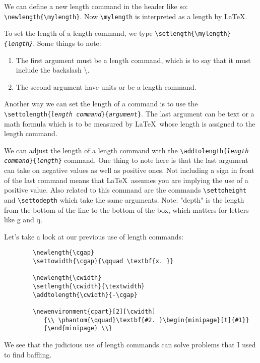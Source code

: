 \documentclass{amsart}
\begin{document}
	We can define a new length command in the header like so:
	\verb+\newlength{\mylength}+.
	Now \verb+\mylength+ is interpreted as a length by \LaTeX. 

	To set the length of a length command, we type
	\verb+\setlength{\mylength}+\texttt{\emph{\{length\}}}.
	Some things to note: 
	\begin{enumerate}
		\item The first argument must be a length 
			command, which is to say that it must include the backslash 
			\textbackslash. 
		\item The second argument have units or be a length command. 
	\end{enumerate}

	Another way we can set the length of a command is to use the
	\verb+\settolength+\texttt{\{\emph{length command}\}\{\emph{argument}\}}.
	The last argument can be text or a math formula which is to be measured
	by \LaTeX\ whose length is assigned to the length command. 
	
	We can adjust the length of a length command with the 
	\verb+\addtolength+\texttt{\{\emph{length command}\}\{\emph{length}\}}
	command. 
	One thing to note here is that the last argument can take on negative
	values as well as positive ones. 
	Not including a sign in front of the last command means that \LaTeX\
	assumes you are implying the use of a positive value. 
	Also related to this command are the commands
	\verb+\settoheight+ and \verb+\settodepth+ which take the same
	arguments. 
	Note: "depth" is the length from the bottom of the line to the
	bottom of the box, which matters for letters like g and q. 

	Let's take a look at our previous use of length commands:
	\begin{verbatim}
		\newlength{\cgap}
		\settowidth{\cgap}{\qquad \textbf{x. }}

		\newlength{\cwidth}
		\setlength{\cwidth}{\textwidth}
		\addtolength{\cwidth}{-\cgap}

		\newenvironment{cpart}[2][\cwidth]
		   {\\ \phantom{\qquad}\textbf{#2. }\begin{minipage}[t]{#1}}
		   {\end{minipage} \\}
	\end{verbatim}
	We see that the judicious use of length commands can solve 
	problems that I used to find baffling. 
\end{document}
